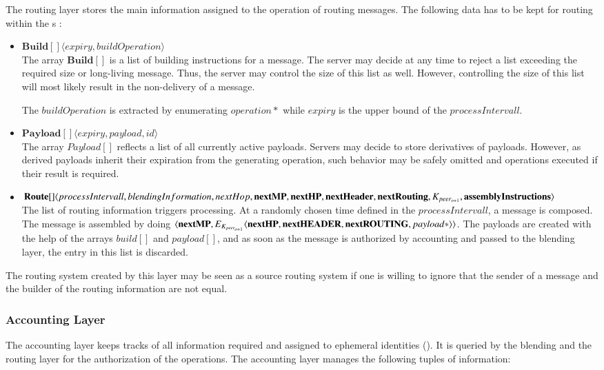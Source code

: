 The routing layer stores the main information assigned to the operation of routing messages. The following data has to be kept for routing within the s :
\begin{itemize}
	\item $\mathbf{Build[]}\langle expiry, buildOperation \rangle$\\
	The array $\mathbf{Build[]}$ is a list of building instructions for a message. The server may decide at any time to reject a list exceeding the required size or long-living message. Thus, the server may control the size of this list as well. However, controlling the size of this list will most likely result in the non-delivery of a message. 
	
	The $buildOperation$ is extracted by enumerating $operation*$ while $expiry$ is the upper bound of the $processIntervall$.
	\item $\mathbf{Payload[]}\langle expiry, payload, id \rangle$\\
	The array $Payload[]$ reflects a list of all currently active payloads. Servers may decide to store derivatives of payloads. However, as derived payloads inherit their expiration from the generating operation, such behavior may be safely omitted and operations executed if their result is required.
	
	\item $\splitatcommas{\mathbf{Route[]}\langle processIntervall, blendingInformation, nextHop, \mathbf{nextMP}, \mathbf {nextHP}, \mathbf{nextHeader}, \mathbf{nextRouting}, K_{peer_{o+1}}, \mathbf{assemblyInstructions} \rangle}$\\
	The list of routing information triggers processing. At a randomly chosen time defined in the $processIntervall$, a message is composed. The message is assembled by doing $\splitatcommas{\langle \mathbf{nextMP}, E_{K_{peer_{o+1}}}\langle \mathbf{nextHP}, \mathbf{nextHEADER}, \mathbf{nextROUTING}, payload* \rangle \rangle}$. The payloads are created with the help of the arrays $build[]$ and $payload[]$, and as soon as the message is authorized by accounting and passed to the blending layer, the entry in this list is discarded.
\end{itemize}

The routing system created by this layer may be seen as a source routing system if one is willing to ignore that the sender of a message and the builder of the routing information are not equal.

\subsubsection{Accounting Layer}\label{sec:accountingLayer}
The accounting layer keeps tracks of all information required and assigned to ephemeral identities (). It is queried by the blending and the routing layer for the authorization of the operations. The accounting layer manages the following tuples of information:


